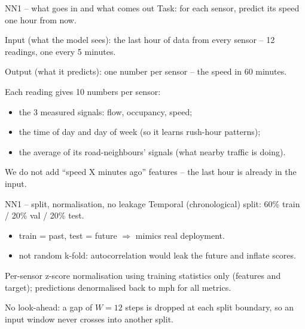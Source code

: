 \documentclass[aspectratio=169]{beamer}
\begin{document}
\begin{frame}{NN1 -- what goes in and what comes out}
\small
Task: for each sensor, predict its speed one hour from now.

\vspace{0.5em}
Input (what the model sees): the last hour of data from every sensor -- 12 readings, one every 5 minutes.

\vspace{0.5em}
Output (what it predicts): one number per sensor -- the speed in 60 minutes.

\vspace{0.5em}
Each reading gives 10 numbers per sensor:
\begin{itemize}
  \item the 3 measured signals: flow, occupancy, speed;
  \item the time of day and day of week (so it learns rush-hour patterns);
  \item the average of its road-neighbours' signals (what nearby traffic is doing).
\end{itemize}

\vspace{0.5em}
We do not add ``speed X minutes ago'' features -- the last hour is already in the input.
\end{frame}

\begin{frame}{NN1 -- split, normalisation, no leakage}
\small
Temporal (chronological) split: 60\% train / 20\% val / 20\% test.

\begin{itemize}
  \item train = past, test = future $\Rightarrow$ mimics real deployment.
  \item not random k-fold: autocorrelation would leak the future and inflate scores.
\end{itemize}

\vspace{0.6em}
Per-sensor z-score normalisation using training statistics only (features and target);
predictions denormalised back to mph for all metrics.

\vspace{0.6em}
No look-ahead: a gap of $W = 12$ steps is dropped at each split boundary,
so an input window never crosses into another split.
\end{frame}
\end{document}
